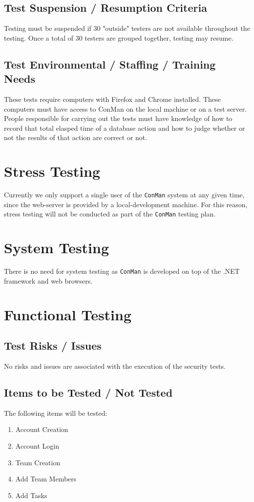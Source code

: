 \documentclass{article}
\begin{document}
\subsection{Test Suspension / Resumption Criteria}
Testing must be suspended if 30 "outside" testers are not available throughout the 
testing. Once a total of 30 testers are grouped together, testing may resume.

\subsection{Test Environmental / Staffing / Training Needs}
These tests require computers with Firefox and Chrome installed. These computers must
have access to ConMan on the local machine or on a test server. People responsible for
carrying out the tests must have knowledge of how to record that total elasped time 
of a database action and how to judge whether or not the results of that action are 
correct or not.

\newpage
\section{Stress Testing}
Currently we only support a single user of the \texttt{ConMan} system at any given time, since the web-server is provided by a local-development machine.
For this reason, stress testing will not be conducted as part of the \texttt{ConMan} testing plan.

\newpage
\section{System Testing}
There is no need for system testing as \texttt{ConMan} is developed on top 
of the .NET framework and web browsers.

\newpage
\section{Functional Testing}
\subsection{Test Risks / Issues}
No risks and issues are associated with the execution of the security tests.

\subsection{Items to be Tested / Not Tested}
The following items will be tested:
\begin{enumerate}
\item Account Creation
\item Account Login
\item Team Creation
\item Add Team Members
\item Add Tasks
\end{enumerate}
\end{document}
